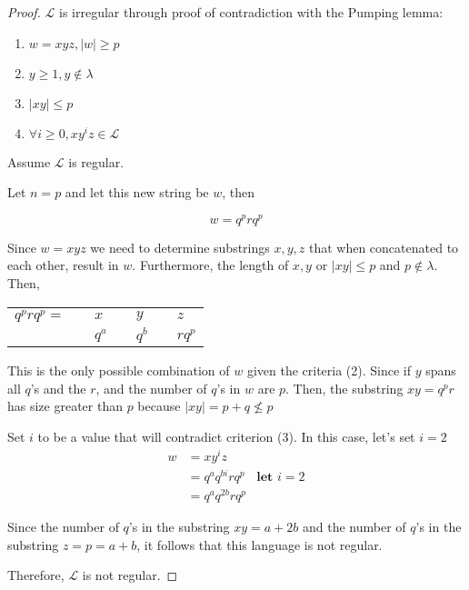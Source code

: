 \begin{proof}
    $\mathcal{L}$ is irregular through proof of contradiction with the Pumping lemma: 
    \begin{enumerate}
        \item $w=xyz, |w| \geq p$
        \item $y\geq 1, y\notin\lambda$
        \item $|xy|\leq p$
        \item $\forall i\geq 0, xy^iz\in\mathcal{L}$
    \end{enumerate}
    
    Assume $\mathcal{L}$ is regular.
    
    Let $n = p$ and let this new string be $w$, then
    
    \[
    w = q^p r q^p
    \]
    
    Since $w=xyz$ we need to determine substrings $x,y,z$ that when concatenated to each other, result in $w$. Furthermore, the length of $x,y$ or $|xy|\leq p$ and $p\notin \lambda$. Then,
    
    \begin{center}
        \begin{tabular}{llll}
             $q^prq^p = $   & $\quad x$   & $\quad y$    & $\quad z$        \\
                            & $\quad q^a$ & $\quad q^b$  & $\quad r q^p$  
        \end{tabular}
    \end{center}
    
    This is the only possible combination of $w$ given the criteria (2). Since if $y$ spans all $q$'s and the $r$, and the number of $q$'s in $w$ are $p$. Then, the substring $xy=q^pr$ has size greater than $p$ because $|xy| =p+q\nleq p$
    
    Set $i$ to be a value that will contradict criterion (3). In this case, let's set $i=2$
    \begin{align*}
        w & = xy^iz & \\
          & = q^aq^{bi}rq^p & \textbf{let } i = 2 \\
          & = q^aq^{2b}rq^p &
    \end{align*}
    
    Since the number of $q$'s in the substring $xy = a+2b$ and the number of $q$'s in the substring $z = p=a+b$, it follows that this language is not regular.
    
    Therefore, $\mathcal{L}$ is not regular.
\end{proof}
